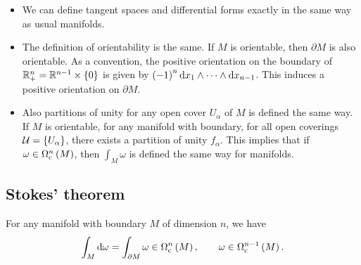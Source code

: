 \begin{remark}
\hfill
\begin{itemize}
\item We can define tangent spaces and differential forms exactly in the same way as usual manifolds.
\item The definition of orientability is the same. If $ M $ is orientable, then $ \partial M $ is also orientable. As a convention, the positive orientation on the boundary of $ \RR_+^n = \RR^{n - 1} \times \cbr{0} $ is given by $ \br{-1}^n\d x_1 \wedge \dots \wedge \d x_{n - 1} $. This induces a positive orientation on $ \partial M $.
\item Also partitions of unity for any open cover $ U_\alpha $ of $ M $ is defined the same way. If $ M $ is orientable, for any manifold with boundary, for all open coverings $ \UUU = \cbr{U_\alpha} $, there exists a partition of unity $ f_\alpha $. This implies that if $ \omega \in \Omega_\c^n\br{M} $, then $ \int_M \omega $ is defined the same way for manifolds.
\end{itemize}
\end{remark}

\subsection{Stokes' theorem}

\begin{theorem}[Stokes]
For any manifold with boundary $ M $ of dimension $ n $, we have
$$ \int_M \d\omega = \int_{\partial M} \omega \in \Omega_\c^n\br{M}, \qquad \omega \in \Omega_\c^{n - 1}\br{M}. $$
\end{theorem}

\pagebreak

